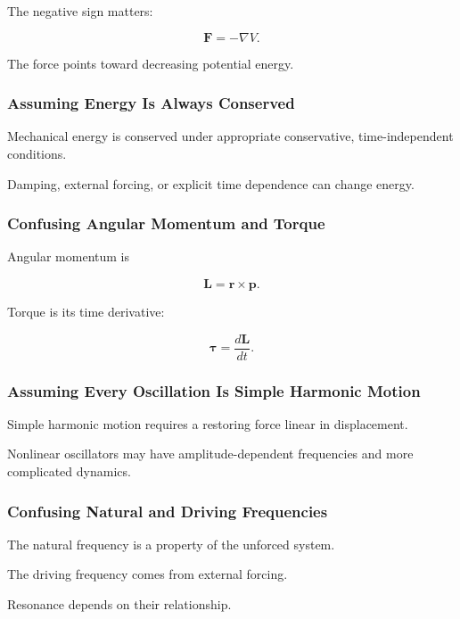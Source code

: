 The negative sign matters:

\[
\boxed{
\mathbf{F}
=
-\nabla V.
}
\]

The force points toward decreasing potential energy.

\subsubsection{Assuming Energy Is Always Conserved}

Mechanical energy is conserved under appropriate conservative,
time-independent conditions.

Damping, external forcing, or explicit time dependence can change energy.

\subsubsection{Confusing Angular Momentum and Torque}

Angular momentum is

\[
\mathbf{L}
=
\mathbf{r}\times\mathbf{p}.
\]

Torque is its time derivative:

\[
\boldsymbol{\tau}
=
\frac{d\mathbf{L}}{dt}.
\]

\subsubsection{Assuming Every Oscillation Is Simple Harmonic Motion}

Simple harmonic motion requires a restoring force linear in displacement.

Nonlinear oscillators may have amplitude-dependent frequencies and more
complicated dynamics.

\subsubsection{Confusing Natural and Driving Frequencies}

The natural frequency is a property of the unforced system.

The driving frequency comes from external forcing.

Resonance depends on their relationship.

